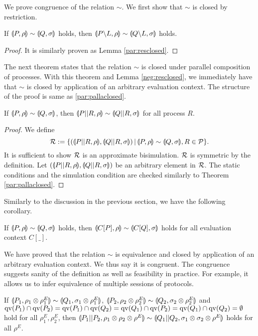 We prove congruence of the relation $\sim$. 
We first show that $\sim$ is closed by restriction.
\begin{lem}
\label{neg:resclosed}
 If $\llparenthesis P, \rho \rrparenthesis \sim \llparenthesis Q, \sigma \rrparenthesis$ holds, then
 $\llparenthesis P \backslash L, \rho \rrparenthesis \sim \llparenthesis Q \backslash L, \sigma \rrparenthesis$ holds.
\end{lem}
\begin{proof}
It is similarly proven as Lemma \ref{par:resclosed}.
\end{proof}

The next theorem states that the relation $\sim$ is closed
under parallel composition of processes.
With this theorem and Lemma \ref{neg:resclosed}, we immediately 
have that $\sim$ is closed by application of an arbitrary evaluation
context.
The structure of the proof is same as \ref{par:pallaclosed}. 
\begin{thm}
\label{neg:parclosed}
  If $\llparenthesis P, \rho \rrparenthesis \sim \llparenthesis Q, \sigma \rrparenthesis$, then
 $\llparenthesis P||R, \rho \rrparenthesis \sim \llparenthesis Q||R, \sigma \rrparenthesis$ for all
 process $R$.
\end{thm}
\begin{proof}
 We define 
\[
 \mathcal{R} := \{(\llparenthesis P||R, \rho \rrparenthesis, \llparenthesis Q||R, \sigma \rrparenthesis)\,|\,
 \llparenthesis P, \rho \rrparenthesis \sim \llparenthesis Q, \sigma \rrparenthesis, R \in \mathcal{P}
 \}. 
\]
 It is sufficient to show $\mathcal{R}$ is an approximate bisimulation.
 $\mathcal{R}$ is symmetric by the definition.
 Let $(\llparenthesis P||R, \rho \rrparenthesis, \llparenthesis Q||R, \sigma \rrparenthesis)$ be an arbitrary element in
 $\mathcal{R}$. The static conditions and the simulation condition 
 are checked similarly to Theorem \ref{par:pallaclosed}.
\end{proof}
Similarly to the discussion in the previous section,
we have the following corollary.
\begin{col}
\label{neg:congruence}
 If $\llparenthesis P, \rho \rrparenthesis \sim \llparenthesis Q, \sigma \rrparenthesis$ holds, then
 $\llparenthesis C[P], \rho \rrparenthesis \sim \llparenthesis C[Q], \sigma \rrparenthesis$ holds for
 all evaluation context $C[\_]$.
\end{col}
We have proved that the relation $\sim$ is equivalence and closed
by application of an arbitrary evaluation context.
We thus say it is congruent. The congruence 
suggests sanity of the definition as well as feasibility in practice.
For example, it allows us to infer equivalence of
multiple sessions of protocols.
\begin{col}
\label{neg:multisession}
 If $\llparenthesis P_1, \rho_1 \otimes \rho^E_1 \rrparenthesis \sim \llparenthesis Q_1, \sigma_1
 \otimes \rho^E_1 \rrparenthesis$,
$\llparenthesis P_2, \rho_2 \otimes \rho^E_2 \rrparenthesis \sim \llparenthesis Q_2, \sigma_2 \otimes
 \rho^E_2 \rrparenthesis$ and $\mathrm{qv}(P_1)\cap \mathrm{qv}(P_2)=\mathrm{qv}(P_1)\cap \mathrm{qv}(Q_2)=\mathrm{qv}(Q_1)\cap
 \mathrm{qv}(P_2)=\mathrm{qv}(Q_1)\cap \mathrm{qv}(Q_2)=\emptyset$
 hold for all $\rho^E_1, \rho^E_2$, then
$\llparenthesis P_1 || P_2, \rho_1 \otimes \rho_2 \otimes \rho^E \rrparenthesis \sim \llparenthesis Q_1 ||
 Q_2, \sigma_1 \otimes \sigma_2 \otimes \rho^E \rrparenthesis$ holds for all $\rho^E$.
\end{col}
